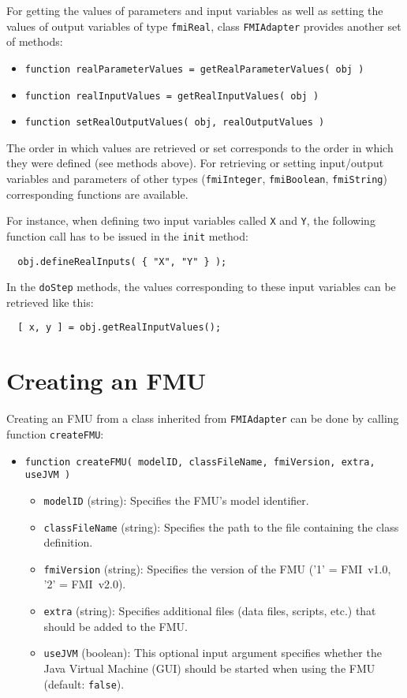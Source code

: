 For getting the values of parameters and input variables as well as setting the values  of output variables of type \texttt{fmiReal}, class \texttt{FMIAdapter} provides another set of methods:
\begin{itemize}
  \item \texttt{function realParameterValues = getRealParameterValues( obj )}
  \item \texttt{function realInputValues = getRealInputValues( obj )}
  \item \texttt{function setRealOutputValues( obj, realOutputValues )}
\end{itemize}
The order in which values are retrieved or set corresponds to the order in which they were defined (see methods above).
For retrieving or setting input/output variables and parameters of other types (\texttt{fmiInteger}, \texttt{fmiBoolean}, \texttt{fmiString}) corresponding functions are available.

For instance, when defining two input variables called \texttt{X} and \texttt{Y}, the following function call has to be issued in the \texttt{init} method:
\begin{verbatim}
  obj.defineRealInputs( { "X", "Y" } );
\end{verbatim}
In the \texttt{doStep} methods, the values corresponding to these input variables can be retrieved like this:
\begin{verbatim}
  [ x, y ] = obj.getRealInputValues();
\end{verbatim}


\section{Creating an FMU}

Creating an FMU from a class inherited from \texttt{FMIAdapter} can be done by calling function \texttt{createFMU}:
\begin{itemize}
  \item \texttt{function createFMU( modelID, classFileName, fmiVersion, extra, useJVM )}
  \begin{itemize}
    \item \texttt{modelID} (string): Specifies the FMU's model identifier.
    \item \texttt{classFileName} (string): Specifies the path to the file containing the class definition.
    \item \texttt{fmiVersion} (string): Specifies the version of the FMU ('1' = FMI~v1.0, '2' = FMI~v2.0).
    \item \texttt{extra} (string): Specifies additional files (data files, \matlab scripts, etc.) that should be added to the FMU.
    \item \texttt{useJVM} (boolean): This optional input argument specifies whether the Java Virtual Machine (\matlab GUI) should be started when using the FMU (default: \texttt{false}).
  \end{itemize}
\end{itemize}
